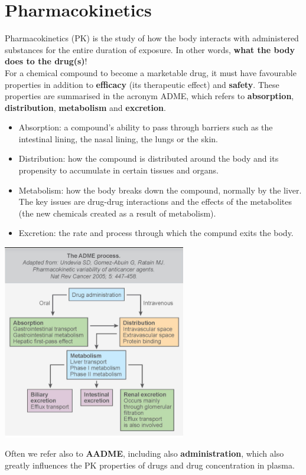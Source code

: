 \documentclass{book}
\begin{document}
\section{Pharmacokinetics}
Pharmacokinetics (PK) is the study of how the body interacts with administered substances for
the entire duration of exposure.
In other words, \textbf{what the body does to the drug(s)}!
\\
For a chemical compound to become a marketable drug, it must have favourable properties in addition to \textbf{efficacy} (its therapeutic effect) and \textbf{safety}. 
These properties are summarised in the acronym ADME, which refers to \textbf{absorption}, \textbf{distribution}, \textbf{metabolism} and \textbf{excretion}.

\begin{itemize}
    \item Absorption: a compound's ability to pass through barriers such as the intestinal lining, the nasal lining, the lungs or the skin.
    \item Distribution: how the compound is distributed around the body and its propensity to accumulate in certain tissues and organs.
    \item Metabolism: how the body breaks down the compound, normally by the liver. The key issues are drug-drug interactions and the effects of the metabolites (the new chemicals created as a result of metabolism).
    \item Excretion: the rate and process through which the compund exits the body.
\end{itemize}

\includegraphics[width=0.6\textwidth, center]{images/image_1.png}

Often we refer also to \textbf{AADME}, including also \textbf{administration}, which also greatly influences the PK properties of drugs and drug concentration in plasma.
\end{document}
